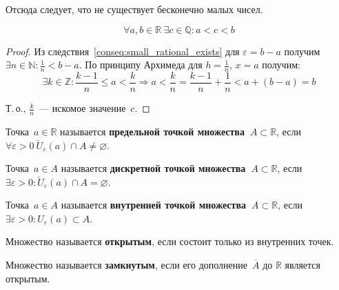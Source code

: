 Отсюда следует, что не существует бесконечно малых чисел.

\begin{consequent}
\begin{equation*}
\forall a, b \in \mathbb R \ \exists c \in \mathbb Q \colon a < c < b
\end{equation*}
\end{consequent}
\begin{proof}
Из следствия~\ref*{conseq:small_rational_exists} для $\varepsilon = b - a$ получим $\exists n \in \mathbb N \colon \frac1n < b - a$.
По принципу Архимеда для $h = \frac1n$, $x = a$ получим:
\begin{equation*}
\exists k \in \mathbb Z \colon \frac{k - 1}n \leqslant a < \frac{k}n \Rightarrow
a < \frac{k}n = \frac{k - 1}n + \frac1n < a + (b - a) = b
\end{equation*}

Т.\,о., $\frac{k}n$~--- искомое значение~$c$.
\end{proof}

 Точка~$a \in \mathbb R$ называется \textbf{предельной точкой множества~$A \subset \mathbb R$}, если
$\forall \varepsilon > 0 \ \breve U_\varepsilon(a) \cap A \neq \varnothing$.

 Точка~$a \in A$ называется \textbf{дискретной точкой множества~$A \subset \mathbb R$}, если
$\exists \varepsilon > 0 \colon \breve U_\varepsilon(a) \cap A = \varnothing$.

 Точка~$a \in A$ называется \textbf{внутренней точкой множества~$A \subset \mathbb R$}, если
$\exists \varepsilon > 0 \colon U_\varepsilon(a) \subset A$.

Множество называется \textbf{открытым}, если состоит только из внутренних точек.

Множество называется \textbf{замкнутым}, если его дополнение~$\overline A$ до $\mathbb R$ является открытым.


